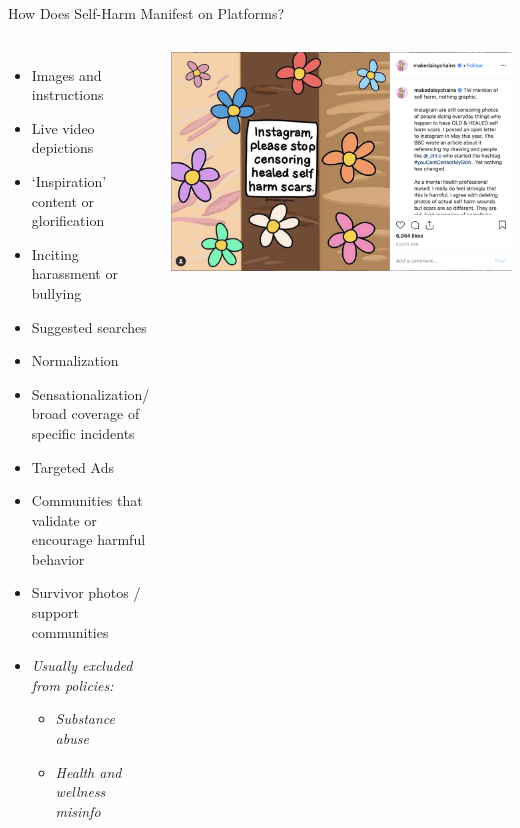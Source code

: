 \documentclass[nobackground,dvipsnames,table,aspectratio=169]{beamer}
\begin{document}
\begin{frame}{How Does Self-Harm Manifest on Platforms?}
    \begin{columns}
            \footnotesize
            \begin{itemize}
                \item Images and instructions
                \item Live video depictions
                \item ‘Inspiration’ content or glorification
                \item Inciting harassment or bullying
                \item Suggested searches
                \item Normalization 
                \item Sensationalization/ broad coverage of specific incidents
                \item Targeted Ads
                \item Communities that validate or encourage harmful behavior
                \item Survivor photos / support communities
                \item \textit{Usually excluded from policies:}
                \begin{itemize}
                    \footnotesize
                    \item \textit{Substance abuse}
                    \item \textit{Health and wellness misinfo}
                \end{itemize}
            \end{itemize}
            \includegraphics[width=\textwidth]{message-to-instagram}
    \end{columns}
\end{frame}
\end{document}
